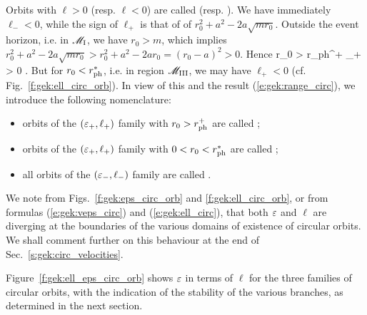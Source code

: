 Orbits with $\ell > 0$ (resp. $\ell < 0$) are called 
(resp. ).
We have immediately $\ell_- < 0$, while the sign of $\ell_+$ is that of
of $r_0^2 + a^2 - 2 a \sqrt{mr_0}$.
Outside the event horizon, i.e. in $\mathscr{M}_{\rm I}$, we have $r_0 > m$, which
implies $r_0^2 + a^2 - 2 a \sqrt{mr_0} > r_0^2 + a^2 - 2 a r_0 = (r_0 - a)^2 > 0$. Hence
\be
    r_0 > r_{\rm ph}^+ \quad\Longrightarrow\quad \ell_+ > 0 .
\ee
But for $r_0 < r_{\rm ph}^*$, i.e. in region $\mathscr{M}_{\rm III}$, we may have $\ell_+ < 0$
(cf. Fig.~\ref{f:gek:ell_circ_orb}).
In view of this and the result (\ref{e:gek:range_circ}), we introduce the following nomenclature:
\begin{itemize}
\item orbits of the $(\varepsilon_+,\ell_+)$ family with $r_0 >  r_{\rm ph}^+$
are called ;
\item orbits of the $(\varepsilon_+,\ell_+)$ family with $0 < r_0 < r_{\rm ph}^*$
are called ;
\item all orbits of the $(\varepsilon_-,\ell_-)$ family
are called .
\end{itemize}

We note from Figs.~\ref{f:gek:eps_circ_orb} and \ref{f:gek:ell_circ_orb},
or from formulas (\ref{e:gek:veps_circ}) and (\ref{e:gek:ell_circ}),
that both $\varepsilon$ and $\ell$ are diverging at the boundaries of the various domains
of existence of circular orbits. We shall comment further on this behaviour at the end of
Sec.~\ref{s:gek:circ_velocities}.

Figure~\ref{f:gek:ell_eps_circ_orb} shows $\varepsilon$ in terms of $\ell$
for the three families of circular orbits, with the indication of
the stability of the various
branches, as determined in the next section.

